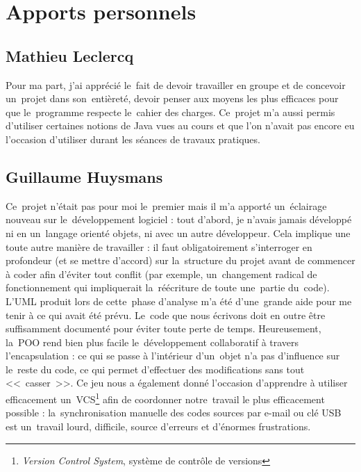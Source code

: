 \section{Apports personnels}

\subsection{Mathieu Leclercq}
Pour ma part, j'ai apprécié le~fait de devoir travailler en groupe et de concevoir un~projet dans son~entièreté,
devoir penser aux moyens les plus efficaces pour que le~programme respecte le~cahier des charges. 
Ce~projet m'a aussi permis d'utiliser certaines notions de Java vues au cours et que l'on n'avait pas encore eu 
l'occasion d'utiliser durant les séances de travaux pratiques.   

\subsection{Guillaume Huysmans}
Ce~projet n'était pas pour moi le~premier mais il m'a apporté un~éclairage nouveau sur le~développement logiciel : 
tout d'abord, je n'avais jamais développé ni en un~langage orienté objets, ni avec un autre développeur. 
Cela implique une toute autre manière de travailler : il faut obligatoirement s'interroger en profondeur (et se mettre d'accord) 
sur la~structure du projet avant de commencer à coder afin d'éviter tout conflit (par exemple, un~changement radical 
de fonctionnement qui impliquerait la~réécriture de toute une~partie du~code). 
L'UML produit lors de cette~phase d'analyse m'a été d'une~grande aide pour me tenir à ce qui avait été prévu. 
Le~code que nous écrivons doit en outre être suffisamment documenté pour éviter toute perte de temps.
Heureusement, la~POO rend bien plus facile le~développement collaboratif à travers l'encapsulation : ce qui se passe à l'intérieur 
d'un~objet n'a pas d'influence sur le~reste du code, ce qui permet d'effectuer des modifications sans tout <<~casser~>>. 
Ce jeu nous a également donné l'occasion d'apprendre à utiliser efficacement 
un~VCS\footnote{\emph{Version Control System}, système de contrôle de versions} 
afin de coordonner notre~travail le plus efficacement possible : la~synchronisation manuelle des codes sources par e-mail ou 
clé USB est un~travail lourd, difficile, source d'erreurs et d'énormes frustrations.